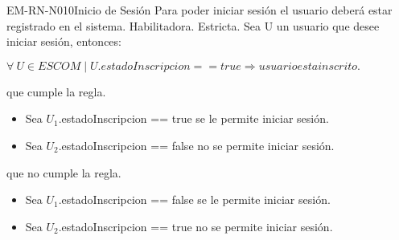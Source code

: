 \begin{BussinesRule}{EM-RN-N010}{Inicio de Sesión}
	\BRitem[Descripción:] Para poder iniciar sesión el usuario deberá estar registrado en el sistema.
	\BRitem[Tipo: ] Habilitadora.
	\BRitem[Nivel: ] Estricta.
	\BRitem[Sentencia : ] Sea U un usuario que desee iniciar sesión, entonces:
	\begin{center}
		$\forall \: U \in  ESCOM \mid U.estadoInscripcion == true \Rightarrow usuario esta inscrito.$
	\end{center}
	 que cumple la regla.
		\begin{itemize}
			\item Sea $U_{1}$.estadoInscripcion == true se le permite iniciar sesión.
			\item Sea $U_{2}$.estadoInscripcion == false no se permite iniciar sesión.
		\end{itemize}
	 que no cumple la regla.
		\begin{itemize}
			\item Sea $U_{1}$.estadoInscripcion == false se le permite iniciar sesión.
			\item Sea $U_{2}$.estadoInscripcion == true no se permite iniciar sesión.
		\end{itemize}
\end{BussinesRule}

